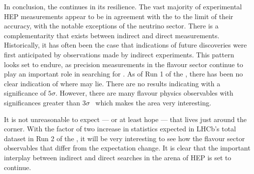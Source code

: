 In conclusion, the \sm continues in its resilience.
The vast majority of experimental \gls{HEP} measurements appear to be in agreement with the \sm to
the limit of their accuracy, with the notable exceptions of the neutrino sector.
There is a complementarity that exists between indirect and direct measurements.
Historically, it has often been the case that indications of future discoveries were first
anticipated by observations made by indirect experiments.
This pattern looks set to endure,
as precision measurements in the flavour sector continue to play an important role in searching for
\np.
As of Run 1 of the \lhc, there has been no clear indication of where \np may lie.
There are no results indicating \np with a significance of $5\sigma$.
However, there are many flavour physics observables with significances greater than
$3\sigma$~\cite{LHCb-CONF-2015-002,LHCb-PAPER-2015-025,Lees:2013uzd,Lees:2012xj,Bozek:2010xy,LHCb-PAPER-2014-024,LHCb-PAPER-2015-023}
which makes the area very interesting.

It is not unreasonable to expect --- or at least hope --- that \np lives just
around the corner.
With the factor of two increase in statistics expected in LHCb's total dataset in Run 2 of the
\lhc, it will be very interesting to see how the flavour sector observables that differ from the
\sm expectation change.
It is clear that the important interplay between indirect and direct searches in the arena of
\gls{HEP} is set to continue.


%








\clearpage
